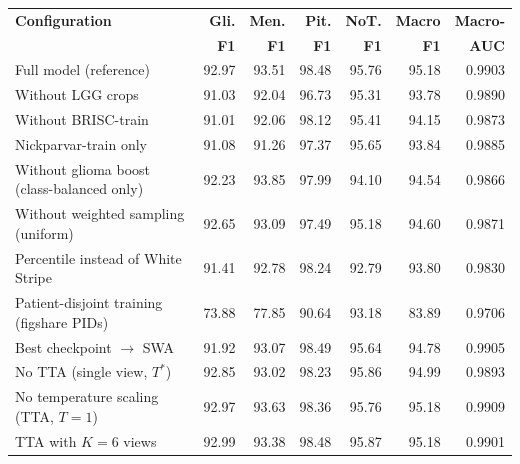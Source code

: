 \begin{tabular}{>{\raggedright\arraybackslash}p{3.4cm} r r r r r r}
\toprule
\textbf{Configuration} & \textbf{Gli.} & \textbf{Men.} & \textbf{Pit.} & \textbf{NoT.} & \textbf{Macro} & \textbf{Macro-} \\
 & \textbf{F1} & \textbf{F1} & \textbf{F1} & \textbf{F1} & \textbf{F1} & \textbf{AUC} \\
\midrule
Full model (reference) & 92.97 & 93.51 & 98.48 & 95.76 & 95.18 & 0.9903 \\
\midrule
Without LGG crops & 91.03 & 92.04 & 96.73 & 95.31 & 93.78 & 0.9890 \\
Without BRISC-train & 91.01 & 92.06 & 98.12 & 95.41 & 94.15 & 0.9873 \\
Nickparvar-train only & 91.08 & 91.26 & 97.37 & 95.65 & 93.84 & 0.9885 \\
Without glioma boost (class-balanced only) & 92.23 & 93.85 & 97.99 & 94.10 & 94.54 & 0.9866 \\
Without weighted sampling (uniform) & 92.65 & 93.09 & 97.49 & 95.18 & 94.60 & 0.9871 \\
Percentile instead of White Stripe & 91.41 & 92.78 & 98.24 & 92.79 & 93.80 & 0.9830 \\
Patient-disjoint training (figshare PIDs) & 73.88 & 77.85 & 90.64 & 93.18 & 83.89 & 0.9706 \\
\midrule
Best checkpoint $\rightarrow$ SWA & 91.92 & 93.07 & 98.49 & 95.64 & 94.78 & 0.9905 \\
No TTA (single view, $T^{*}$) & 92.85 & 93.02 & 98.23 & 95.86 & 94.99 & 0.9893 \\
No temperature scaling (TTA, $T=1$) & 92.97 & 93.63 & 98.36 & 95.76 & 95.18 & 0.9909 \\
TTA with $K{=}6$ views & 92.99 & 93.38 & 98.48 & 95.87 & 95.18 & 0.9901 \\
\bottomrule
\end{tabular}
